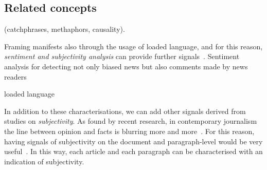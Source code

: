 

\subsection{Related concepts}
\label{ssec:lit_framing_other}


\cite{mandal2017overview,gao2018neural,asghar2016automatic} (catchphrases, methaphors, causality).

Framing manifests also through the usage of loaded language, and for this reason, \textit{sentiment and subjectivity analysis} can provide further signals~\cite{liu2010sentiment}.
Sentiment analysis for detecting not only biased news but also comments made by news readers~\cite{park2011politics}

loaded language

In addition to these characterisations, we can add other signals derived from studies on \emph{subjectivity}.
As found by recent research, in contemporary journalism the line between opinion and facts is blurring more and more~\cite{blake2019news}. For this reason, having signals of subjectivity on the document and paragraph-level would be very useful~\cite{liu2010sentiment}.
In this way, each article and each paragraph can be characterised with an indication of subjectivity.



